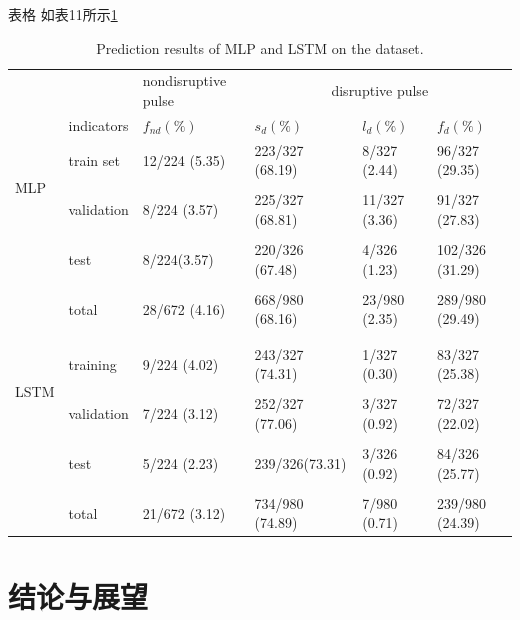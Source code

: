 \documentclass[8pt,compress,t,notheorems,noamsthm,notheorem,xcolor=x11names]{beamer}
\theoremstyle{nonumberplain}%
\theoremstyle{plain}
\begin{document}
\begin{frame}{表格}
如表11所示\ref{tab11}
\begin{center}
	\begin{table}
		\caption{Prediction results of MLP and LSTM  on the dataset.}
		\centering{}%
		\footnotesize{}
		\begin{tabular}{p{1.0cm}<{\centering} p{1cm}<{\centering} p{2cm}<{\centering} p{1.5cm}<{\centering} p{1.5cm}<{\centering} p{1.5cm}<{\centering}}
			
			\toprule 
			&  & nondisruptive pulse  & \multicolumn{3}{c}{  disruptive pulse  }\\
			\cmidrule{4-6}
			& indicators & $f_{nd}(\%)$ & $s_{d}(\%)$ & $l_{d}(\%)$ & $f_{d}(\%)$ \\
			\midrule 
			\multirow{4}{*}{MLP} & train set & 12/224 (5.35) & 223/327 (68.19) & 8/327 (2.44) & 96/327 (29.35)\\
			\\
			& validation & 8/224 (3.57) & 225/327 (68.81) & 11/327 (3.36) & 91/327 (27.83)\\
			\\
			& test & 8/224(3.57) & 220/326 (67.48) & 4/326 (1.23) & 102/326 (31.29)\\
			\\
			& total & 28/672 (4.16) & 668/980 (68.16) & 23/980 (2.35) & 289/980 (29.49) \\
			\\
			\\
			\multirow{4}{*}{LSTM} & training & 9/224 (4.02) & 243/327 (74.31) & 1/327 (0.30) & 83/327 (25.38)\\
			\\
			& validation  & 7/224 (3.12)  & 252/327 (77.06) & 3/327 (0.92) & 72/327 (22.02)\\
			\\
			& test & 5/224 (2.23) & 239/326(73.31) & 3/326 (0.92) & 84/326 (25.77)\\
			\\
			& total & 21/672 (3.12) & 734/980 (74.89) & 7/980 (0.71) & 239/980 (24.39)\\
			
			\bottomrule
		\end{tabular}
		\label{tab11}
	\end{table}
\end{center}
\end{frame}

\section{结论与展望}
\end{document}
